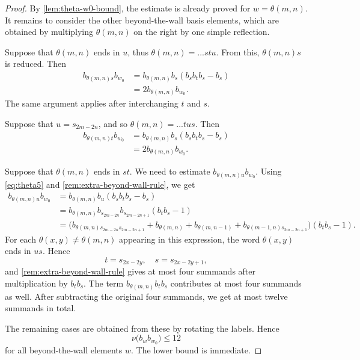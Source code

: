 \documentclass[a4paper,11pt]{amsart}
\let\emph\relax
\newcommand{\nuop}{\nu}
\numberwithin{equation}{subsection}
\theoremstyle{definition}
\theoremstyle{remark}
\begin{document}
\begin{proof}
By \autoref{lem:theta-w0-bound}, the estimate is already proved for
\(w=\theta(m,n)\). It remains to consider the other beyond-the-wall basis
elements, which are obtained by multiplying \(\theta(m,n)\) on the right by one
simple reflection.

\smallskip

\noindent\emph{Case 1.}
Suppose that \(\theta(m,n)\) ends in \(u\), thus $\theta(m,n) = ...stu$. From this,
\(\theta(m,n)s\) is reduced. Then
\[
\begin{aligned}
b_{\theta(m,n)s}b_{w_0}
&=
b_{\theta(m,n)}b_s(b_sb_tb_s-b_s)
\\
&=
2b_{\theta(m,n)}b_{w_0}.
\end{aligned}
\]
The same argument applies after interchanging \(t\) and \(s\).

\smallskip

\noindent\emph{Case 2.}
Suppose that $u = s_{2m-2n}$, and so $\theta(m,n) = ...tus$. Then
\[
\begin{aligned}
b_{\theta(m,n)t}b_{w_0}
&=
b_{\theta(m,n)}b_s(b_sb_tb_s-b_s)
\\
&=
2b_{\theta(m,n)}b_{w_0}.
\end{aligned}
\]

\smallskip

\noindent\emph{Case 3.}
Suppose that \(\theta(m,n)\) ends in \(st\). We need to estimate
\(b_{\theta(m,n)u}b_{w_0}\). Using \autoref{eq:theta5} and
\autoref{rem:extra-beyond-wall-rule}, we get
\[
\begin{aligned}
b_{\theta(m,n)u}b_{w_0}
&=
b_{\theta(m,n)}b_u(b_sb_tb_s-b_s)
\\
&=
b_{\theta(m,n)}b_{s_{2m-2n}}b_{s_{2m-2n+1}}(b_tb_s-1)
\\
&=
\bigl(
b_{\theta(m,n)s_{2m-2n}s_{2m-2n+1}}
+
b_{\theta(m,n)}
+
b_{\theta(m,n-1)}
+
b_{\theta(m-1,n)s_{2m-2n+1}}
\bigr)(b_tb_s-1).
\end{aligned}
\]
For each \(\theta(x,y)\neq\theta(m,n)\) appearing in this expression, the word
\(\theta(x,y)\) ends in \(us\). Hence
\[
t=s_{2x-2y},
\quad
s=s_{2x-2y+1},
\]
and \autoref{rem:extra-beyond-wall-rule} gives at most four summands after
multiplication by \(b_tb_s\). The term \(b_{\theta(m,n)}b_tb_s\) contributes at
most four summands as well. After subtracting the original four summands, we get
at most twelve summands in total.

The remaining cases are obtained from these by rotating the labels. Hence
\[
\nuop\bigl(b_wb_{w_0}\bigr)\leq 12
\]
for all beyond-the-wall elements \(w\). The lower bound is immediate.
\end{proof}
\end{document}
